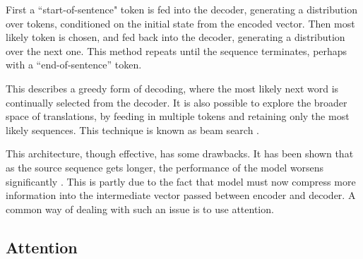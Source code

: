 First a ``start-of-sentence" token is fed into the decoder, generating a distribution over tokens, conditioned on the initial state from the encoded vector. 
Then most likely token is chosen, and fed back into the decoder, generating a distribution over the next one. 
This method repeats until the sequence terminates, perhaps with a ``end-of-sentence'' token.

This describes a greedy form of decoding, where the most likely next word is continually selected from the decoder.  It is also possible to explore the broader space of translations, by feeding in multiple tokens and retaining only the most likely sequences. This technique is known as beam search \citep{freitag_beam_2017-2}.

This architecture, though effective, has some drawbacks. It has been shown that as the source sequence gets longer, the performance of the model worsens significantly \citep{cho_properties_2014}. 
This is partly due to the fact that model must now compress more information into the intermediate vector passed between encoder and decoder. A common way of dealing with such an issue is to use attention. 




\subsection{Attention} %

